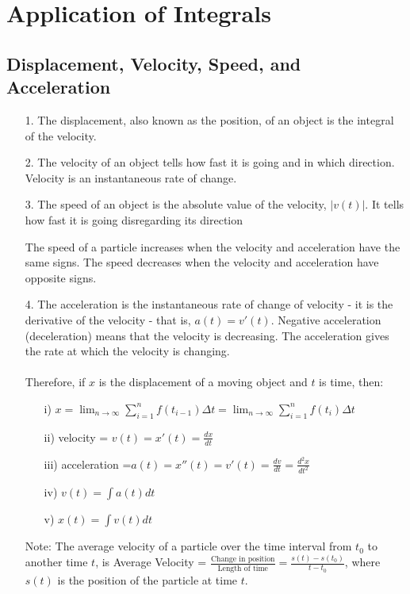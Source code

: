 \documentclass[10pt]{report}
\begin{document}
\section{Application of Integrals}
\subsection{Displacement, Velocity, Speed, and Acceleration}
\begin{itemize}
\item[1.]The displacement, also known as the position, of an object is the integral of the velocity.
\item[2.]The velocity of an object tells how fast it is going and in which direction. Velocity is an instantaneous rate of change.
\item[3.]The speed of an object is the absolute value of the velocity, $|v(t)|$. It tells how fast it is going disregarding its direction

The speed of a particle increases when the velocity and acceleration have the same signs. The speed decreases when the velocity and acceleration have opposite signs.
\item[4.]The acceleration is the instantaneous rate of change of velocity - it is the derivative of the velocity - that is, $a(t)=v'(t)$. Negative acceleration (deceleration) means that the velocity is decreasing. The acceleration gives the rate at which the velocity is changing.\\\\
Therefore, if $x$ is the displacement of a moving object and $t$ is time, then:
\begin{itemize}
\item[i)]$x=\lim_{n\to\infty} \sum_{i=1}^n f(t_{i-1})\Delta t= \lim_{n\to\infty} \sum_{i=1}^n f(t_i)\Delta t$
\item[ii)]velocity = $v(t)=x'(t) =\frac{dx}{dt}$
\item[iii)]acceleration =$a(t)=x''(t) =v'(t) =\frac{dv}{dt} =\frac{d^2x}{dt^2}$
\item[iv)]$v(t)=\int a(t)dt$
\item[v)]$x(t)=\int v(t)dt$
\end{itemize}
\item[Note:]The average velocity of a particle over the time interval from $t_0$ to another time $t$, is Average Velocity = $\frac{\text{Change in position}}{\text{Length of time}} =\frac{s(t)-s(t_0)}{t-t_0}$, where $s(t)$ is the position of the particle at time $t$.
\end{itemize}
\end{document}
